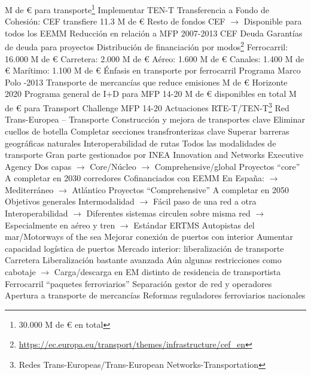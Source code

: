 \documentclass{nuevotema}
\begin{document}
\begin{esquemal}
				 M de € para transporte\footnote{30.000 M de € en total}
				\4[] Implementar TEN-T
				\4 Transferencia a Fondo de Cohesión:
				\4[] CEF transfiere 11.3 M de €
				\4 Resto de fondos CEF
				\4[] $\to$ Disponible para todos los EEMM
				\4 Reducción en relación a MFP 2007-2013
				\4 CEF Deuda
				\4[] Garantías de deuda para proyectos
				\4 Distribución de financiación por modos\footnote{\url{https://ec.europa.eu/transport/themes/infrastructure/cef_en}}
				\4[] Ferrocarril: 16.000 M de €
				\4[] Carretera: 2.000 M de €
				\4[] Aéreo: 1.600 M de €
				\4[] Canales: 1.400 M de €
				\4[] Marítimo: 1.100 M de €
				\4[$\then$] Énfasis en transporte por ferrocarril
			\3 Programa Marco Polo
				-2013
				\4 Transporte de mercancías que reduce emisiones
				 M de €
			\3 Horizonte 2020
				\4 Programa general de I+D para MFP 14-20
				 M de € disponibles en total
				 M de € para Transport Challenge
				\4[] MFP 14-20
		\2 Actuaciones
			\3 RTE-T/TEN-T\footnote{Redes Trans-Europeas/Trans-European Networks-Transportation}
				\4 Red Trans-Europea -- Transporte
				\4 Construcción y mejora de transportes clave
				\4[] Eliminar cuellos de botella
				\4[] Completar secciones transfronterizas clave
				\4[] Superar barreras geográficas naturales
				\4[] Interoperabilidad de rutas
				\4 Todos las modalidades de transporte
				\4 Gran parte gestionados por INEA
				\4[] Innovation and Networks Executive Agency
				\4 Dos capas
				\4[] $\to$ Core/Núcleo
				\4[] $\to$ Comprehensive/global
				\4 Proyectos ``core''
				\4[] A completar en 2030
				 corredores
				\4[] Cofinanciados con EEMM
				\4[] En España:
				\4[] $\to$ Mediterráneo
				\4[] $\to$ Atlántico
				\4 Proyectos ``Comprehensive''
				\4[] A completar en 2050
				\4 Objetivos generales
				\4[] Intermodalidad
				\4[] $\to$ Fácil paso de una red a otra
				\4[] Interoperabilidad
				\4[] $\to$ Diferentes sistemas circulen sobre misma red
				\4[] $\to$ Especialmente en aéreo y tren
				\4[] $\to$ Estándar ERTMS
				\4 Autopistas del mar/Motorways of the sea
				\4[] Mejorar conexión de puertos con interior
				\4[] Aumentar capacidad logística de puertos
			\3 Mercado interior: liberalización de transporte
				\4 Carretera
				\4[] Liberalización bastante avanzada
				\4[] Aún algunas restricciones como cabotaje
				\4[] $\to$ {Carga/descarga en EM distinto de residencia de transportista}
				\4 Ferrocarril
				\4[] ``paquetes ferroviarios''
				\4[] Separación gestor de red y operadores
				\4[] Apertura a transporte de mercancías
				\4[] Reformas reguladores ferroviarios nacionales

\end{esquemal}
\end{document}
